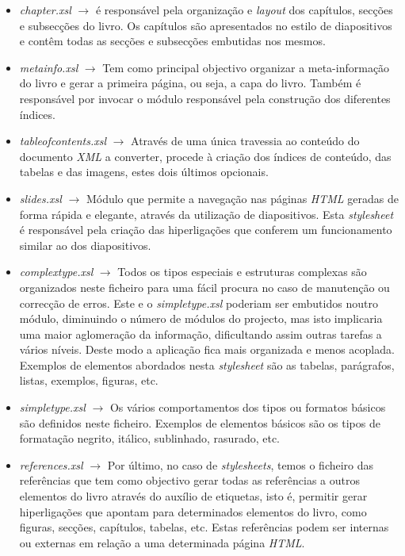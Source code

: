 \documentclass[a4paper]{article}
\begin{document}
\begin{itemize}

        \item \emph{chapter.xsl} $\rightarrow$ é responsável pela organização e \emph{layout} dos capítulos, secções e subsecções do livro.
        Os capítulos são apresentados no estilo de diapositivos e contêm todas as secções e subsecções embutidas nos mesmos.
        
        \item \emph{metainfo.xsl} $\rightarrow$ Tem como principal objectivo organizar a meta-informação do livro e gerar a primeira página, ou seja, a capa do livro. Também é responsável por invocar o módulo responsável pela construção dos diferentes índices.
                                            
        \item \emph{tableofcontents.xsl} $\rightarrow$ Através de uma única travessia ao conteúdo do documento \emph{XML} a converter, procede à criação dos índices de conteúdo, das tabelas e das imagens, estes dois últimos opcionais.
        
        \item \emph{slides.xsl} $\rightarrow$ Módulo que permite a navegação nas páginas \emph{HTML} geradas de forma rápida e elegante, através da utilização de diapositivos. Esta \emph{stylesheet} é responsável pela criação das hiperligações que conferem um funcionamento similar ao dos diapositivos.
        
        \item \emph{complextype.xsl} $\rightarrow$ Todos os tipos especiais e estruturas complexas são organizados neste ficheiro para uma fácil procura no caso de manutenção ou correcção de erros. Este e o \emph{simpletype.xsl} poderiam ser embutidos noutro módulo, diminuindo o número de módulos do projecto, mas isto implicaria uma maior aglomeração da informação, dificultando assim outras tarefas a vários níveis. Deste modo a aplicação fica mais organizada e menos acoplada. Exemplos de elementos abordados nesta \emph{stylesheet} são as tabelas, parágrafos, listas, exemplos, figuras, etc.
        
        \item \emph{simpletype.xsl} $\rightarrow$ Os vários comportamentos dos tipos ou formatos básicos são definidos neste ficheiro. Exemplos de elementos básicos são os tipos de formatação negrito, itálico, sublinhado, rasurado, etc.
        
        \item \emph{references.xsl} $\rightarrow$ Por último, no caso de \emph{stylesheets}, temos o ficheiro das referências que tem como objectivo gerar todas as referências a outros elementos do livro através do auxílio de etiquetas, isto é, permitir gerar hiperligações que apontam para determinados elementos do livro, como figuras, secções, capítulos, tabelas, etc. Estas referências podem ser internas ou externas em relação a uma determinada página \emph{HTML}.\\
\end{itemize}
\end{document}
